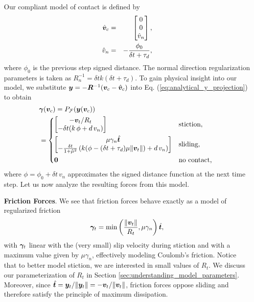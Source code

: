 Our compliant model of contact is defined by
\begin{eqnarray*}
	\hat{{\bm{v}}}_c &=&
	\begin{bmatrix}
		0\\
		0\\
		\hat{v}_n \end{bmatrix}\nonumber,\\
	\hat{v}_n &=& -\frac{\phi_0}{\delta t+\tau_d},
\end{eqnarray*}
where $\phi_0$ is the previous step signed distance. The normal direction
regularization parameters is taken as $R_n^{-1} = \delta t k(\delta t+\tau_d)$.
To gain physical insight into our model, we substitute
${\bm{y}}=-{\bm{R}}^{-1}({\bm{v}}_c - \hat{{\bm{v}}}_c)$ into Eq.
(\ref{eq:analytical_y_projection}) to obtain
\begin{align*}
	&{\bm\gamma}({\bm{v}}_c) = P_\mathcal{F}({\bm{y}}({\bm{v}}_c))\\
&=\begin{dcases}
	\begin{bmatrix}
		-{\bm{v}}_t/R_t\\
		-\delta t(k\,\phi + d\,v_n)
	\end{bmatrix}
	& \text{stiction, } \\
	\begin{bmatrix}
		\mu\gamma_n\hat{{\bm{t}}}\\
		-\frac{\delta t}{1+\tilde\mu^2}\left(k(\phi-(\delta
		t+\tau_d)\mu\Vert{\bm{v}}_t\Vert) + d\,v_n \right)
	\end{bmatrix}
	& \text{sliding, }\\
    {\bm{0}} & \text{no contact, } \end{dcases}\nonumber	
\end{align*}
where $\phi= \phi_0 + \delta t\,v_n$ approximates the signed distance function
at the next time step. Let us now analyze the resulting forces from this model.

\textbf{Friction Forces}. We see that friction forces behave exactly as a model
of regularized friction
\begin{equation*}
	{\bm\gamma}_t = \min\left(\frac{\Vert{\bm{v}}_t\Vert}{R_t}, \mu\gamma_n\right)\hat{{\bm{t}}},
\end{equation*}
with ${\bm\gamma}_t$ linear with the (very small) slip velocity during stiction and
with a maximum value given by $\mu\gamma_n$, effectively modeling Coulomb's
friction. Notice that to better model stiction, we are interested in small
values of $R_t$. We discuss our parameterization of $R_t$ in Section
\ref{sec:understanding_model_parameters}. Moreover, since $\hat{{\bm{t}}} =
{\bm{y}}_t/\Vert{\bm{y}}_t\Vert = -{\bm{v}}_t/\Vert{\bm{v}}_t\Vert$, friction forces
oppose sliding and therefore satisfy the principle of maximum dissipation.

